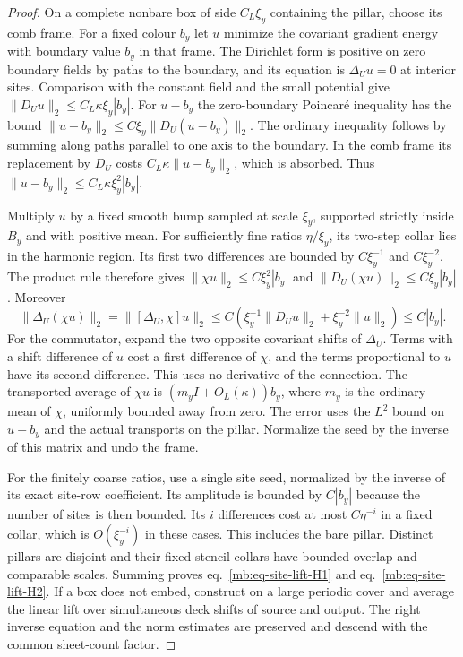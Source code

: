 \documentclass[11pt,letterpaper,reqno]{amsart}
\numberwithin{equation}{section}
\renewcommand{\eqref}[1]{\textup{eq.~\ref{#1}}}
\theoremstyle{definition}
\theoremstyle{remark}
\begin{document}
\begin{proof}
On a complete nonbare box of side \(C_L\xi_y\) containing
the pillar, choose its comb frame. For a fixed colour \(b_y\)
let \(u\) minimize the covariant gradient energy with boundary
value \(b_y\) in that frame. The Dirichlet form is positive
on zero boundary fields by paths to the boundary, and its
equation is \(\Delta_Uu=0\) at interior sites. Comparison
with the constant field and the small potential give
\(\|D_Uu\|_2\le C_L\kappa\xi_y|b_y|\). For \(u-b_y\) the
zero-boundary Poincar\'e inequality has the bound
\(\|u-b_y\|_2\le C\xi_y\|D_U(u-b_y)\|_2\). The ordinary
inequality follows by summing along paths parallel to one
axis to the boundary. In the comb frame its replacement by
\(D_U\) costs \(C_L\kappa\|u-b_y\|_2\), which is absorbed.
Thus \(\|u-b_y\|_2\le C_L\kappa\xi_y^2|b_y|\).

Multiply \(u\) by a fixed smooth bump sampled at scale \(\xi_y\),
supported strictly inside \(B_y\) and with positive mean.
For sufficiently fine ratios \(\eta/\xi_y\), its two-step collar
lies in the harmonic region. Its first two differences are
bounded by \(C\xi_y^{-1}\) and \(C\xi_y^{-2}\). The product rule
therefore gives \(\|\chi u\|_2\le C\xi_y^2|b_y|\) and
\(\|D_U(\chi u)\|_2\le C\xi_y|b_y|\). Moreover
\[
 \|\Delta_U(\chi u)\|_2
       =\|[\Delta_U,\chi]u\|_2
       \le C(\xi_y^{-1}\|D_Uu\|_2+\xi_y^{-2}\|u\|_2)
       \le C|b_y|.
\]
For the commutator, expand the two opposite covariant shifts
of \(\Delta_U\). Terms with a shift difference of \(u\) cost
a first difference of \(\chi\), and the terms proportional to
\(u\) have its second difference. This uses no derivative of
the connection. The transported average of \(\chi u\) is
\((m_y I+O_L(\kappa))b_y\), where \(m_y\) is the ordinary
mean of \(\chi\), uniformly bounded away from zero. The error
uses the \(L^2\) bound on \(u-b_y\) and the actual transports
on the pillar. Normalize the seed by the inverse of this
matrix and undo the frame.

For the finitely coarse ratios, use a single site seed,
normalized by the inverse of its exact site-row coefficient.
Its amplitude is bounded by \(C|b_y|\) because the number of
sites is then bounded. Its \(i\) differences cost at most
\(C\eta^{-i}\) in a fixed collar, which is \(O(\xi_y^{-i})\)
in these cases. This includes the bare pillar. Distinct
pillars are disjoint and their fixed-stencil collars have
bounded overlap and comparable scales. Summing proves
\eqref{mb:eq-site-lift-H1} and \eqref{mb:eq-site-lift-H2}.
If a box does not embed, construct on a large periodic cover
and average the linear lift over simultaneous deck shifts
of source and output. The right inverse equation and the
norm estimates are preserved and descend with the common
sheet-count factor.
\end{proof}
\end{document}
